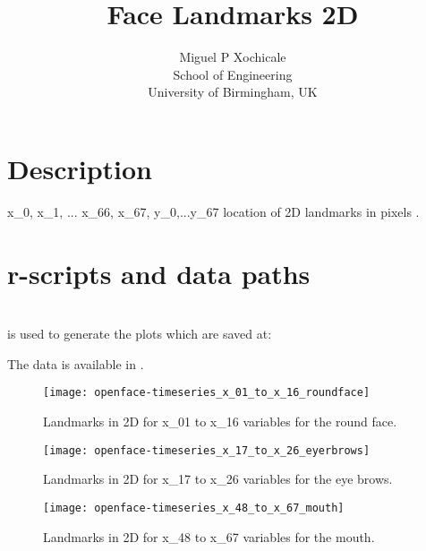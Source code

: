 \documentclass[a4paper,12pt]{article}
\title{Face Landmarks 2D}
\author{Miguel P Xochicale \\
School of Engineering\\
University of Birmingham, UK}
\begin{document}
\maketitle

%


\section{Description}

x\_0, x\_1, ... x\_66, x\_67, y\_0,...y\_67 location of 2D landmarks in pixels \cite{baltrusaitis2016}.




\section{r-scripts and data paths}
 \\
is used to generate the plots which are saved at: \\



The data is available in \cite{mxochicale2018}.











\begin{figure}
\centering
\texttt{[image: openface-timeseries\_x\_01\_to\_x\_16\_roundface]}
\caption{Landmarks in 2D for x\_01 to x\_16 variables for the round face.}
\end{figure}

\begin{figure}
\centering
\texttt{[image: openface-timeseries\_x\_17\_to\_x\_26\_eyerbrows]}
\caption{Landmarks in 2D for x\_17 to x\_26 variables for the eye brows.}
\end{figure}


\begin{figure}
\centering
\texttt{[image: openface-timeseries\_x\_48\_to\_x\_67\_mouth]}
\caption{Landmarks in 2D for x\_48 to x\_67 variables for the mouth.}
\end{figure}
\end{document}
